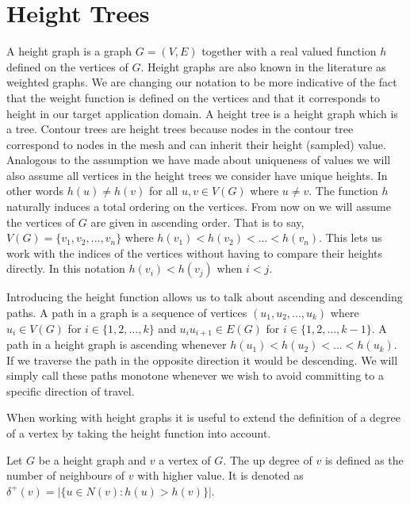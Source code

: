 
\section{Height Trees}


A height graph is a graph $G = (V, E)$ together with a real valued function $h$ defined on the vertices of $G$. Height graphs are also known in the literature as weighted graphs. We are changing our notation to be more indicative of the fact that the weight function is defined on the vertices and that it corresponds to height in our target application domain. A height tree is a height graph which is a tree. Contour trees are height trees because nodes in the contour tree correspond to nodes in the mesh and can inherit their height (sampled) value. Analogous to the assumption we have made about uniqueness of values we will also assume all vertices in the height trees we consider have unique heights. In other words $h(u) \ne h(v)$ for all $u ,v \in V(G)$ where $u \ne v$. The function $h$ naturally induces a total ordering on the vertices. From now on we will assume the vertices of $G$ are given in ascending order. That is to say, $V(G) = \{v_1, v_2, ... , v_n\}$ where $h(v_1) < h(v_2) < ... < h(v_n)$. This lets us work with the indices of the vertices without having to compare their heights directly. In this notation $h(v_i) < h(v_j)$ when $i < j$.


Introducing the height function allows us to talk about ascending and descending paths. A path in a graph is a sequence of vertices $(u_1, u_2, ... , u_k)$ where $u_i \in V(G)$ for $i \in \{1, 2, ..., k\}$ and $u_iu_{i+1} \in E(G)$ for $i \in \{1, 2, ..., k-1\}$. A path in a height graph is ascending whenever $h(u_1) < h(u_2) < ... < h(u_k)$. If we traverse the path in the opposite direction it would be descending. We will simply call these paths monotone whenever we wish to avoid committing to a specific direction of travel.

When working with height graphs it is useful to extend the definition of a degree of a vertex by taking the height function into account.

\begin{defn} Let $G$ be a height graph and $v$ a vertex of $G$. The up degree of $v$ is defined as the number of neighbours of $v$ with higher value. It is denoted as $\delta^+(v) = \big|\{ u \in N(v) : h(u) > h(v) \}\big|$.   \end{defn}

